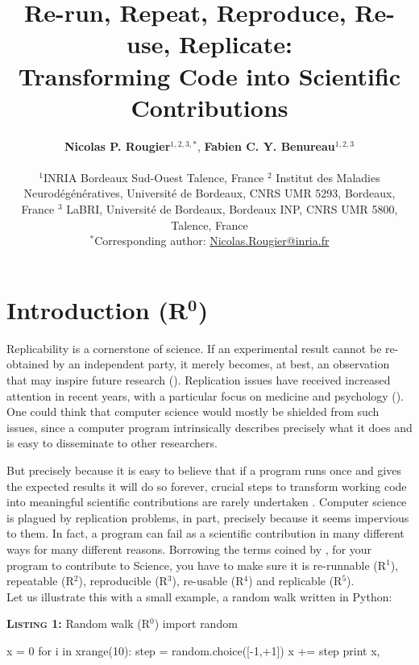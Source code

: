 \documentclass[a4paper,11pt]{article}
\title{Re-run, Repeat, Reproduce, Re-use, Replicate:\\Transforming Code into Scientific Contributions}
\author{
  \textbf{Nicolas P. Rougier}$^{1,2,3,*}$, \textbf{Fabien C. Y. Benureau}$^{1,2,3}$\\
  \begin{minipage}{\textwidth}
    \begin{center}
      \vspace{2mm}
      $^{1}$INRIA Bordeaux Sud-Ouest Talence, France $^{2}$ Institut des
      Maladies Neurodégénératives, Université de Bordeaux, CNRS UMR 5293,
      Bordeaux, France $^{3}$ LaBRI, Université de Bordeaux, Bordeaux INP, CNRS
      UMR 5800, Talence, France\\
      \vspace{2mm}
      $^{*}$Corresponding author:
      \href{mailto:Nicolas.Rougier@inria.fr}{Nicolas.Rougier@inria.fr}         
    \end{center}
  \end{minipage}
}
\date{}
\begin{document}
\maketitle
\section*{Introduction (R$^{\mathbf 0}$)}

Replicability is a cornerstone of science.  If an experimental result cannot be
re-obtained by an independent party, it merely becomes, at best, an observation
that may inspire future research (\cite{Mesirov:2010,osc:2015}). Replication
issues have received increased attention in recent years, with a particular focus on medicine and psychology (\cite{Iqbal:2016}).
One could think that
computer science would mostly be shielded from such issues, since a computer program
intrinsically describes precisely what it does and is easy to disseminate to other researchers.

But precisely because it is easy to believe that if a program runs once and gives the expected
results it will do so forever, crucial steps to transform working code into
meaningful scientific contributions are rarely undertaken
\citep{Sandve:2013,Schwab:2000}. Computer science is plagued by replication
problems, in part, precisely because it seems impervious to them. In fact, a
program can fail as a scientific contribution in many different ways for many
different reasons. Borrowing the terms coined by \citeauthor{Goble:2016}
\citep{Goble:2016}, for your program to contribute to Science, you have to make
sure it is re-runnable (R$^1$), repeatable (R$^2$), reproducible (R$^3$),
re-usable (R$^4$) and replicable (R$^5$).\\

Let us illustrate this with a small example, a random walk written in Python:\\

\noindent \begin{minipage}[c]{\linewidth}
\begin{code}{\textbf{\textsc{Listing 1:}} Random walk (R$^0$)}
import random

x = 0
for i in xrange(10):
    step = random.choice([-1,+1])
    x += step
    print x,
\end{code}
\end{minipage}

\end{document}
